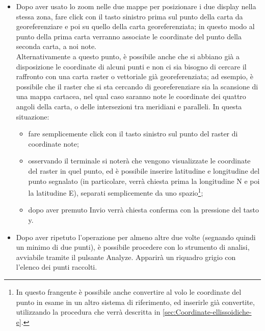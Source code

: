\begin{itemize}
				\item Dopo aver usato lo zoom nelle due mappe per posizionare i due display nella stessa zona, fare click con il tasto sinistro prima sul punto della carta da georeferenziare e poi su quello della carta georeferenziata; in questo modo al punto della prima carta verranno associate le coordinate del punto della seconda carta, a noi note.\\

				Alternativamente a questo punto, è possibile anche che si abbiano già a disposizione le coordinate di alcuni punti e non ci sia bisogno di cercare il raffronto con una carta raster o vettoriale già georeferenziata; ad esempio, è possibile che il raster che si sta cercando di georeferenziare sia la scansione di una mappa cartacea, nel qual caso saranno note le coordinate dei quattro angoli della carta, o delle intersezioni tra meridiani e paralleli. In questa situazione:
				
				\begin{itemize}
					\item fare semplicemente click con il tasto sinistro sul punto del raster di coordinate note;
					
					\item osservando il terminale si noterà che vengono visualizzate le coordinate del raster in quel punto, ed è possibile inserire latitudine e longitudine del punto segnalato (in particolare, verrà chiesta prima la longitudine N e poi la latitudine E), separati semplicemente da uno spazio\footnote{In questo frangente è possibile anche convertire al volo le coordinate del punto in esame in un altro sistema di riferimento, ed inserirle già convertite, utilizzando la procedura che verrà descritta in \textsection\ref{sec:Coordinate-ellissoidiche-e}.}; 
					
					\item dopo aver premuto \textsf{Invio} verrà chiesta conferma con la pressione del tasto \textsf{y}.
				
						
				\end{itemize}

				\item Dopo aver ripetuto l'operazione per almeno altre due volte (segnando quindi un minimo di due punti), è possibile procedere con lo strumento di analisi, avviabile tramite il pulsante \textsf{Analyze}. Apparirà un riquadro grigio con l'elenco dei punti raccolti.
			
			\end{itemize}

